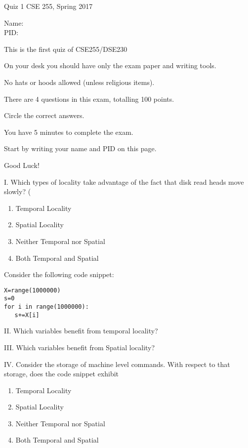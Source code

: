 \documentclass[11pt]{article}
\begin{document}
\setlength\parindent{0pt}
\thispagestyle{empty}

{\textbf \Large Quiz 1} \hfill CSE 255, Spring 2017
\\

\vspace{.1in}

Name: \underline{\hspace{3in}}
\\

PID: \underline{\hspace{3.15in}}

\vspace{.1in}

{\small \setlength\parindent{20pt}This is the first quiz of CSE255/DSE230

On your desk you should have only the exam paper and writing tools.

No hats or hoods allowed (unless religious items).

There are 4 questions in this exam, totalling 100 points.

Circle the correct answers.

You have 5 minutes to complete the exam.

Start by writing your name and PID on this page.

Good Luck!}

\vspace{.1in}

\noindent
I. Which types of locality take advantage of the fact that disk read
heads move slowly? (
\begin{enumerate}
\item Temporal Locality
\item Spatial Locality
\item Neither Temporal nor Spatial
\item Both Temporal and Spatial
\end{enumerate}

\vspace{.1in}
\noindent
Consider the following code snippet:
\begin{verbatim}
X=range(1000000)
s=0
for i in range(1000000):
   s+=X[i]
\end{verbatim}

\vspace{.1in}
\noindent
II. Which variables benefit from temporal locality? \underline{\hspace{3.15in}}

\vspace{.1in}
\noindent
III. Which variables benefit from Spatial locality? \underline{\hspace{3.15in}}

\vspace{.1in}
\noindent
IV. Consider the storage of machine level commands. With respect to that
storage, does the code snippet exhibit
\begin{enumerate}
\item Temporal Locality
\item Spatial Locality
\item Neither Temporal nor Spatial
\item Both Temporal and Spatial
\end{enumerate}


\iffalse
\fi
\end{document}
